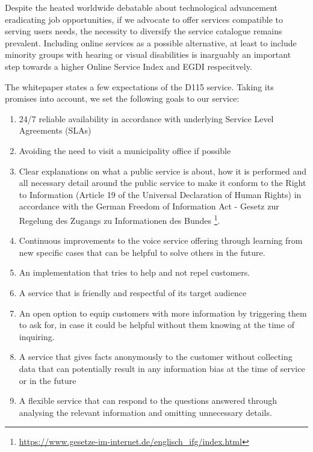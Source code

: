 Despite the heated worldwide debatable about technological advancement eradicating job opportunities, if we advocate to offer services compatible to serving users needs, the necessity to diversify the service catalogue remains prevalent. Including online services as a possible alternative, at least to include minority groups with hearing or visual disabilities is inarguably an important step towards a higher Online Service Index and EGDI respecitvely.

The whitepaper states a few expectations of the D115 service. Taking its promises into account, we set the following goals to our service:
\begin{enumerate}
\item 24/7 reliable availability in accordance with underlying Service Level Agreements (SLAs)

\item Avoiding the need to visit a municipality office if possible

\item Clear explanations on what a public service is about, how it is performed and all necessary detail around the public service to make it conform to the Right to Information (Article 19 of the Universal Declaration of Human Rights) in accordance with the German Freedom of Information Act - Gesetz zur Regelung des Zugangs zu Informationen des Bundes \footnote{\url{ https://www.gesetze-im-internet.de/englisch_ifg/index.html}}.

\item Continuous improvements to the voice service offering through learning from new specific cases that can be helpful to solve others in the future.

\item An implementation that tries to help and not repel customers.

\item A service that is friendly and respectful of its target audience

\item An open option to equip customers with more information by triggering them to ask for, in case it could be helpful without them knowing at the time of inquiring. %

\item A service that gives facts anonymously to the customer without collecting data that can potentially result in any information bias at the time of service or in the future

\item A flexible service that can respond to the questions answered through analysing the relevant information and omitting unnecessary details.



\end{enumerate}





